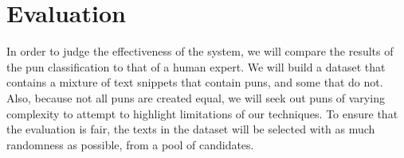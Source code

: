 \section{Evaluation}

In order to judge the effectiveness of the system, we will compare the results of the pun classification to that of a human expert. We will build a dataset that contains a mixture of text snippets that contain puns, and some that do not. Also, because not all puns are created equal, we will seek out puns of varying complexity to attempt to highlight limitations of our techniques. To ensure that the evaluation is fair, the texts in the dataset will be selected with as much randomness as possible, from a pool of candidates.



